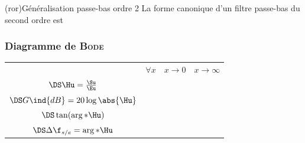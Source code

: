 \documentclass[../../main/main.tex]{subfiles}
\begin{document}
\begin{tcb*}(ror){Généralisation passe-bas ordre 2}
	La forme canonique d'un filtre passe-bas du second ordre est
	\psw{%
	\[
		\boxed{\Hu(x) = \frac{H_0}{1-x^{2} + \jj \frac{x}{Q}}}
		\qav
		x = \frac{\w}{\w_0}
		\qet
		H_0 = \cte
		\qet
		Q \text{~ facteur de qualité}
	\]
	}%
	\vspace{-15pt}
\end{tcb*}

\subsubsection{Diagramme de \textsc{Bode}}
\noindent
\begin{minipage}{\linewidth}
	\centering
	\begin{tabularx}{\linewidth}{cYYY}
		\toprule
		 &
		$\forall x$
		 &
		$x\to 0$
		 &
		$x\to\infty$
		\\
		\addlinespace[0.5em]
		\cmidrule(lr){2-4}
		$\DS\Hu = \frac{\Su}{\Eu}$
		 &
		 &
		 &
		\\
		\addlinespace[0.5em]
		$\DS G\ind{dB} = 20 \log \abs{\Hu}$
		 &
		 &
		 &
		\\
		\addlinespace[0.5em]
		$\DS\tan(\arg*{\Hu})$
		 &
		 &
		 &
		\\
		\addlinespace[0.5em]
		$\DS\Delta\f_{s/e} = \arg*{\Hu}$
		 &
		\psw{$---$}
		 &
		 &
		\psw{$\DS -\pi$}
		\\
		\bottomrule
	\end{tabularx}
	\label{tab:rlc}
\end{minipage}
\end{document}
